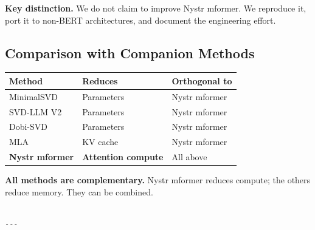 \textbf{Key distinction.} We do not claim to improve Nystr mformer. We reproduce 
it, port it to non-BERT architectures, and document the engineering effort.

\subsection{Comparison with Companion Methods}

\begin{table}[H]
\centering
\small
\begin{tabular}{lll}
\toprule
\textbf{Method} & \textbf{Reduces} & \textbf{Orthogonal to} \\
\midrule
MinimalSVD & Parameters & Nystr mformer \\
SVD-LLM V2 & Parameters & Nystr mformer \\
Dobi-SVD & Parameters & Nystr mformer \\
MLA & KV cache & Nystr mformer \\
\textbf{Nystr mformer} & \textbf{Attention compute} & All above \\
\bottomrule
\end{tabular}
\end{table}

\textbf{All methods are complementary.} Nystr mformer reduces compute; the others 
reduce memory. They can be combined.
\begin{lstlisting}

---
\end{lstlisting}